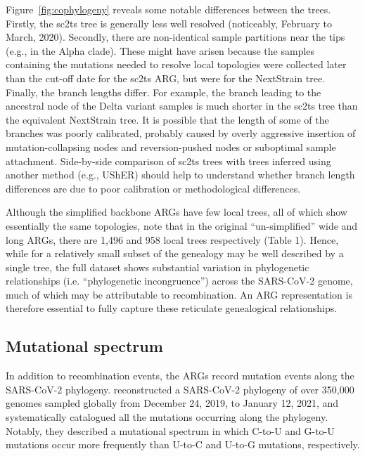 \documentclass{article}
\begin{document}
Figure~\ref{fig:cophylogeny} reveals some notable differences between the trees. Firstly, the sc2ts tree is generally less well resolved (noticeably, February to March, 2020). Secondly, there are non-identical sample partitions near the tips (e.g., in the Alpha clade). These might have arisen because the samples containing the mutations needed to resolve local topologies were collected later than the cut-off date for the sc2ts ARG, but were for the NextStrain tree. Finally, the branch lengths differ. For example, the branch leading to the ancestral node of the Delta variant samples is much shorter in the sc2ts tree than the equivalent NextStrain tree. It is possible that the length of some of the branches was poorly calibrated, probably caused by overly aggressive insertion of mutation-collapsing nodes and reversion-pushed nodes or suboptimal sample attachment. Side-by-side comparison of sc2ts trees with trees inferred using another method (e.g., UShER) should help to understand whether branch length differences are due to poor calibration or methodological differences.

Although the simplified backbone ARGs have few local trees, all of which show essentially the same topologies, note that in the original ``un-simplified'' wide and long ARGs, there are 1,496 and 958 local trees respectively (Table 1). Hence, while for a relatively small subset of the genealogy may be well described by a single tree, the full dataset shows substantial variation in phylogenetic relationships (i.e. ``phylogenetic incongruence'') across the SARS-CoV-2 genome, much of which may be attributable to recombination. An ARG representation is therefore essential to fully capture these reticulate genealogical relationships.

\subsection{Mutational spectrum}
 In addition to recombination events, the ARGs record mutation events along the SARS-CoV-2 phylogeny. \cite{Yi2021-sc} reconstructed a SARS-CoV-2 phylogeny of over 350,000 genomes sampled globally from December 24, 2019, to January 12, 2021, and systematically catalogued all the mutations occurring along the phylogeny. Notably, they described a mutational spectrum in which C-to-U and G-to-U mutations occur more frequently than U-to-C and U-to-G mutations, respectively.
\end{document}
